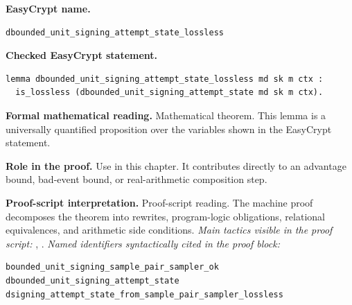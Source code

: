 \begin{formaltheorem}
\noindent\textbf{EasyCrypt name.}
\begin{lstlisting}[language=EasyCrypt,basicstyle=\ttfamily\scriptsize]
dbounded_unit_signing_attempt_state_lossless
\end{lstlisting}
\noindent\textbf{Checked EasyCrypt statement.}
\begin{lstlisting}[language=EasyCrypt,basicstyle=\ttfamily\scriptsize]
lemma dbounded_unit_signing_attempt_state_lossless md sk m ctx :
  is_lossless (dbounded_unit_signing_attempt_state md sk m ctx).
\end{lstlisting}
\noindent\textbf{Formal mathematical reading.}
Mathematical theorem. This lemma is a universally quantified proposition over the variables shown in the EasyCrypt statement.

\noindent\textbf{Role in the proof.}
Use in this chapter. It contributes directly to an advantage bound, bad-event bound, or real-arithmetic composition step.

\noindent\textbf{Proof-script interpretation.}
Proof-script reading. The machine proof decomposes the theorem into rewrites, program-logic obligations, relational equivalences, and arithmetic side conditions.
\emph{Main tactics visible in the proof script:} , .
\emph{Named identifiers syntactically cited in the proof block:}
\begin{lstlisting}[language=EasyCrypt,basicstyle=\ttfamily\scriptsize]
bounded_unit_signing_sample_pair_sampler_ok
dbounded_unit_signing_attempt_state
dsigning_attempt_state_from_sample_pair_sampler_lossless
\end{lstlisting}

\end{formaltheorem}

